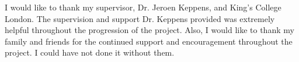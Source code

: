 I would like to thank my supervisor, Dr. Jeroen Keppens, and King's College London. The supervision and support Dr. Keppens provided was extremely helpful throughout the progression of the project. Also, I would like to thank my family and friends for the continued support and encouragement throughout the project. I could have not done it without them.